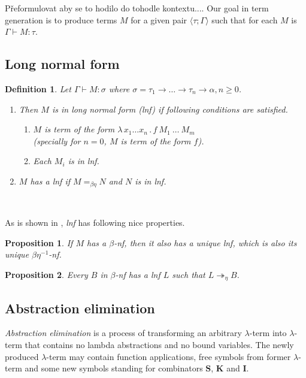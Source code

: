 \documentclass{sig-alternate}
\newtheorem{definition}{Definition}
\newtheorem{proposition}{Proposition}
\newcommand{\lterm}{$\lambda$-term\xspace}
\newcommand{\tur}[3]{#1\vdash{}#2 \colon #3}
\newcommand{\turst}[3]{$#1\vdash{}#2:#3$\xspace}
\newcommand{\GMS}{\turst{\Gamma}{M}{\sigma}}
\newcommand{\lam}[2]{\lambda \, #1 \, . \, #2}
\newcommand{\Scomb }{\mathbf{S}}
\newcommand{\Kcomb }{\mathbf{K}}
\newcommand{\Icomb }{\mathbf{I}}
\newcommand{\bnf}{$\beta$-\textit{nf}\xspace}
\newcommand{\beenf}{$\beta\eta^{-1}$-\textit{nf}\xspace}
\newcommand{\lnf}{\textit{lnf}\xspace}
\newcommand{\ar}{\rightarrow\xspace}
\newcommand{\ul}[2]{\langle #1 ; #2 \rangle}
\begin{document}
Přeformulovat aby se to hodilo do tohodle kontextu....
Our goal in term generation is to produce terms $M$
for a given pair $\ul{\tau}{\Gamma}$
such that for each $M$ is $\tur{\Gamma}{M}{\tau}$.


\subsection{Long normal form}
\label{lnf}


\begin{definition}
Let \GMS where 
$\sigma = \tau_1 \ar \dots \ar \tau_n \ar \alpha, n \geq 0$.
	\begin{enumerate}
	  \item	
		Then $M$ is in \textit{long normal form} (\lnf) if following 
		conditions are satisfied.
		\begin{enumerate}
		 \item $M$ is term of the form $\lam{x_1 \dots x_n}{f~M_1~\dots~M_m}$\\
		  (specially for $n = 0$, $M$ is term of the form $f$).
		 \item Each $M_i$ is in \lnf.
		\end{enumerate}	
	  \item 
	    $M$ has a \lnf if $M =_{\beta\eta} N$ and $N$ is in \lnf.
	\end{enumerate}
\end{definition}~

As is shown in \cite{barendregt10}, \lnf has following nice properties.

\begin{proposition}
If $M$ has a \bnf, 
then it also has a unique \lnf, 
which is also its unique \beenf.
\end{proposition}

\begin{proposition}
Every $B$ in \bnf has a \lnf 
$L$ such that $L \twoheadrightarrow_{\eta} B$.
\end{proposition}

\subsection{Abstraction elimination}

\textit{Abstraction elimination} is a process of transforming 
an arbitrary \lterm into \lterm that contains no lambda abstractions
and no bound variables.
The newly produced \lterm may contain function applications, 
free symbols from former \lterm and some new symbols standing for 
combinators $\Scomb$, $\Kcomb$ and $\Icomb$. \\
\end{document}
